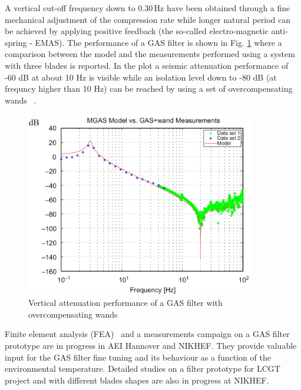 A vertical cut-off frequency down to 0.30\,Hz have been obtained through a fine mechanical 
adjustment of the compression rate while longer natural period can be achieved by applying 
positive feedback (the so-called electro-magnetic anti-spring - EMAS). 
The performance of a GAS filter is shown in Fig. \ref{fig:hamsassensv} where a comparison 
between the model and the measurements performed using a system with three blades is reported.
In the plot a seismic attenuation performance of -60 dB at about 10 Hz is visible
while an isolation level down to -80 dB (at frequncy higher than 10 Hz) can be reached by using 
a set of overcompensating wands ~\cite{stochino}.

\begin{figure}[htbp!]
\centering
\includegraphics[width=10cm]{./Sec_Suspensions/Figures/hamsassensv.pdf}
\caption{Vertical attenuation performance of a GAS filter with overcompensating 
wands \cite{stochino}}
\label{fig:hamsassensv}
\end{figure}

Finite element analysis (FEA)~\cite{Hennes} and a measurements campaign on a GAS filter 
prototype are in progress in AEI Hannover and NIKHEF. They provide valuable input 
for the GAS filter fine tuning and its behaviour as a function of the environmental temperature.  
Detailed studies on a filter prototype for LCGT project and with different blades shapes 
are also in progress at NIKHEF.
 

%